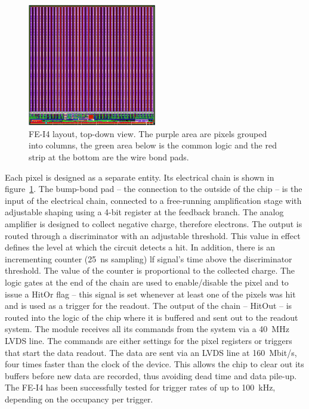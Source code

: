 \begin{figure}[!t]
\centering
\includegraphics[width=0.5\textwidth]{04_charge_monitoring/pics/fei41}
\caption{FE-I4 layout, top-down view. The purple area are pixels grouped into columns, the green area below is the common logic and the red strip at the bottom are the wire bond pads.}
\label{fig:anapix}
\end{figure}

Each pixel is designed as a separate entity. Its electrical chain is shown in figure~\ref{fig:anapix}. The bump-bond pad -- the connection to the outside of the chip -- is the input of the electrical chain, connected to a free-running amplification stage with adjustable shaping using a 4-bit register at the feedback branch. The analog amplifier is designed to collect negative charge, therefore electrons. The output is routed through a discriminator with an adjustable threshold. This value in effect defines the level at which the circuit detects a hit. In addition, there is an incrementing counter (25~ns sampling) lf signal's time above the discriminator threshold. The value of the counter is proportional to the collected charge. The logic gates at the end of the chain are used to enable/disable the pixel and to issue a HitOr flag -- this signal is set whenever at least one of the pixels was hit and is used as a trigger for the readout. The output of the chain -- HitOut -- is routed into the logic of the chip where it is buffered and sent out to the readout system. The module receives all its commands from the system via a 40~MHz LVDS line. The commands are either settings for the pixel registers or triggers that start the data readout. The data are sent via an LVDS line at 160~Mbit/s, four times faster than the clock of the device. This allows the chip to clear out its buffers before new data are recorded, thus avoiding dead time and data pile-up. The FE-I4 has been successfully tested for trigger rates of up to 100~kHz, depending on the occupancy per trigger. 

